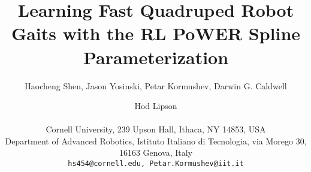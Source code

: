 \documentclass[letterpaper]{article}
\title{Learning Fast Quadruped Robot Gaits with the RL PoWER Spline Parameterization}
\author{Haocheng Shen, Jason Yosinski, Petar Kormushev, Darwin G. Caldwell \and Hod Lipson  \\
  \mbox{}\\
Cornell University, 239 Upson Hall, Ithaca, NY 14853, USA\\
Department of Advanced Robotics, Istituto Italiano di Tecnologia, via Morego 30, 16163 Genova, Italy \\
\texttt{hs454@cornell.edu, Petar.Kormushev@iit.it}}
\begin{document}
\maketitle


\begin{abstract}

\end{abstract}
























\footnotesize


\end{document}
